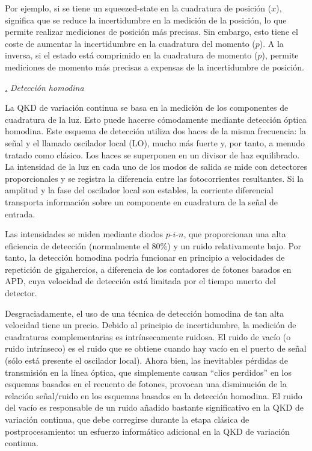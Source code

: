 \documentclass[a4paper,11pt]{book} %
\numberwithin{equation}{chapter}
\def\subsubiContadorIt{\par\addtocounter{subsubsection}{1}\underline{\it\thesubsubsection.}\hskip0.5cm \setcounter{subsubsubsectionIt}{0}}
\newcommand{\SubsubiIt}[1]{
		\subsubiContadorIt \textit{#1}
	}
\newcounter{subsubsubsectionIt}[subsubsection]
\begin{document}
Por ejemplo, si se tiene un squeezed-state en la cuadratura de posición ($x$), significa que se reduce la incertidumbre en la medición de la posición, lo que permite realizar mediciones de posición más precisas. Sin embargo, esto tiene el coste de aumentar la incertidumbre en la cuadratura del momento ($p$). A la inversa, si el estado está comprimido en la cuadratura de momento ($p$), permite mediciones de momento más precisas a expensas de la incertidumbre de posición.


		\SubsubiIt{Detección homodina}

La QKD de variación continua se basa en la medición de los componentes de cuadratura de la luz. Esto puede hacerse cómodamente mediante detección óptica homodina. Este esquema de detección utiliza dos haces de la misma frecuencia: la señal y el llamado oscilador local (LO), mucho más fuerte y, por tanto, a menudo tratado como clásico. Los haces se superponen en un divisor de haz equilibrado. La intensidad de la luz en cada uno de los modos de salida se mide con detectores proporcionales y se registra la diferencia entre las fotocorrientes resultantes. Si la amplitud y la fase del oscilador local son estables, la corriente diferencial transporta información sobre un componente en cuadratura de la señal de entrada. 

Las intensidades se miden mediante diodos $p$-$i$-$n$, que proporcionan una alta eficiencia de detección (normalmente el 80\%) y un ruido relativamente bajo. Por tanto, la detección homodina podría funcionar en principio a velocidades de repetición de gigahercios, a diferencia de los contadores de fotones basados en APD, cuya velocidad de detección está limitada por el tiempo muerto del detector.

Desgraciadamente, el uso de una técnica de detección homodina de tan alta velocidad tiene un precio. Debido al principio de incertidumbre, la medición de cuadraturas complementarias es intrínsecamente ruidosa. El ruido de vacío (o ruido intrínseco) es el ruido que se obtiene cuando hay vacío en el puerto de señal (sólo está presente el oscilador local). Ahora bien, las inevitables pérdidas de transmisión en la línea óptica, que simplemente causan ``clics perdidos'' en los esquemas basados en el recuento de fotones, provocan una disminución de la relación señal/ruido en los esquemas basados en la detección homodina. El ruido del vacío es responsable de un ruido añadido bastante significativo en la QKD de variación continua, que debe corregirse durante la etapa clásica de postprocesamiento: un esfuerzo informático adicional en la QKD de variación continua.
\end{document}
